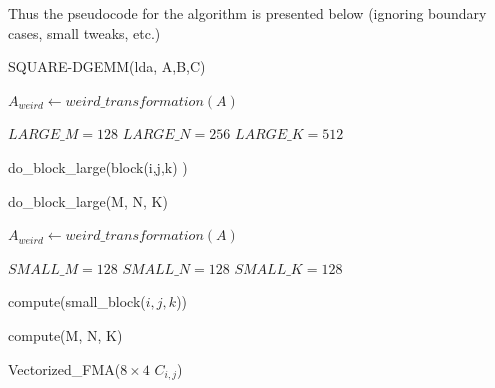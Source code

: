\documentclass[12pt]{article}
\begin{document}
Thus the pseudocode for the algorithm is presented below (ignoring boundary cases, small tweaks, etc.) 

\begin{algorithm}
\caption{SQUARE-DGEMM(lda, A,B,C)}
\begin{algorithmic} 
\STATE $A_{weird} \leftarrow weird\_transformation(A)$

\STATE $LARGE\_M = 128$
\STATE $LARGE\_N = 256$
\STATE $LARGE\_K = 512$




\STATE do\_block\_large(block(i,j,k) )

\ENDFOR
\ENDFOR
\ENDFOR
\end{algorithmic}
\end{algorithm}

\begin{algorithm}
\caption{do\_block\_large(M, N, K)}
\begin{algorithmic} 
\STATE $A_{weird} \leftarrow weird\_transformation(A)$

\STATE $SMALL\_M = 128$
\STATE $SMALL\_N = 128$
\STATE $SMALL\_K = 128$


\STATE compute(small\_block($i,j,k$))

\ENDFOR
\ENDFOR
\ENDFOR
\end{algorithmic}
\end{algorithm}

\begin{algorithm}
\caption{compute(M, N, K)}
\begin{algorithmic} 



\STATE Vectorized\_FMA($8 \times 4$ $C_{i,j}$)

\ENDFOR
\ENDFOR
\end{algorithmic}
\end{algorithm}

\newpage 
\end{document}
